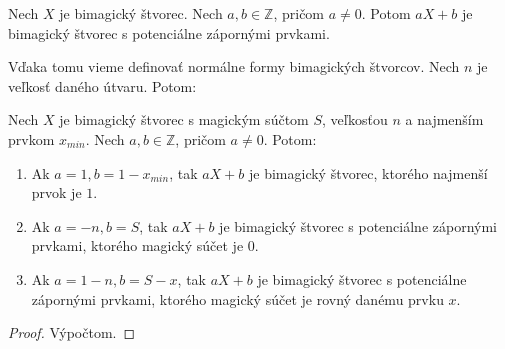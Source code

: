 \begin{consequence} Nech $X$ je bimagický štvorec. Nech $a,b \in \mathbb{Z}$, pričom $a \neq 0$. Potom $aX + b$ je bimagický štvorec s potenciálne zápornými prvkami.
\end{consequence}

Vďaka tomu vieme definovať normálne formy bimagických štvorcov. Nech $n$ je veľkosť daného útvaru. Potom:

\begin{theorem}
\label{5x5bimagic1}
Nech $X$ je bimagický štvorec s magickým súčtom $S$, veľkosťou $n$ a najmenším prvkom $x_{min}$. Nech $a,b \in \mathbb{Z}$, pričom $a \neq 0$. Potom:
\begin{enumerate}
\item Ak $a = 1, b = 1 - x_{min}$, tak $aX+b$ je bimagický štvorec, ktorého najmenší prvok je $1$.
\item Ak $a = -n, b = S$, tak $aX+b$ je bimagický štvorec s potenciálne zápornými prvkami, ktorého magický súčet je $0$.
\item Ak $a = 1-n, b = S-x$, tak $aX+b$ je bimagický štvorec s potenciálne zápornými prvkami, ktorého magický súčet je rovný danému prvku $x$.
\end{enumerate}
\end{theorem}

\begin{proof}
Výpočtom.
\end{proof}


